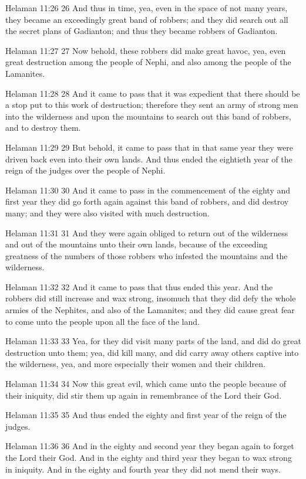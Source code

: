 Helaman 11:26
 26 And thus in time, yea, even in the space of not many years,
they became an exceedingly great band of robbers; and they did
search out all the secret plans of Gadianton; and thus they
became robbers of Gadianton.

Helaman 11:27
 27 Now behold, these robbers did make great havoc, yea, even
great destruction among the people of Nephi, and also among the
people of the Lamanites.

Helaman 11:28
 28 And it came to pass that it was expedient that there should
be a stop put to this work of destruction; therefore they sent an
army of strong men into the wilderness and upon the mountains to
search out this band of robbers, and to destroy them.

Helaman 11:29
 29 But behold, it came to pass that in that same year they were
driven back even into their own lands. And thus ended the
eightieth year of the reign of the judges over the people of
Nephi.

Helaman 11:30
 30 And it came to pass in the commencement of the eighty and
first year they did go forth again against this band of robbers,
and did destroy many; and they were also visited with much
destruction.

Helaman 11:31
 31 And they were again obliged to return out of the wilderness
and out of the mountains unto their own lands, because of the
exceeding greatness of the numbers of those robbers who infested
the mountains and the wilderness.

Helaman 11:32
 32 And it came to pass that thus ended this year. And the
robbers did still increase and wax strong, insomuch that they did
defy the whole armies of the Nephites, and also of the Lamanites;
and they did cause great fear to come unto the people upon all
the face of the land.

Helaman 11:33
 33 Yea, for they did visit many parts of the land, and did do
great destruction unto them; yea, did kill many, and did carry
away others captive into the wilderness, yea, and more especially
their women and their children.

Helaman 11:34
 34 Now this great evil, which came unto the people because of
their iniquity, did stir them up again in remembrance of the Lord
their God.

Helaman 11:35
 35 And thus ended the eighty and first year of the reign of the
judges.

Helaman 11:36
 36 And in the eighty and second year they began again to forget
the Lord their God. And in the eighty and third year they began
to wax strong in iniquity. And in the eighty and fourth year
they did not mend their ways.

